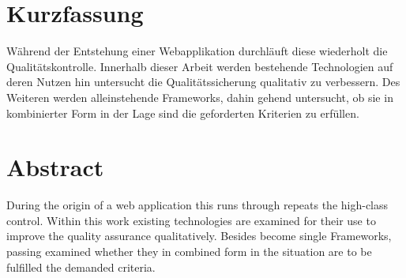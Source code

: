 \section*{Kurzfassung}
Während der Entstehung einer Webapplikation durchläuft diese wiederholt die Qualitätskontrolle. Innerhalb dieser Arbeit werden bestehende Technologien auf deren Nutzen hin untersucht die Qualitätssicherung qualitativ zu verbessern. Des Weiteren werden alleinstehende Frameworks, dahin gehend untersucht, ob sie in kombinierter Form in der Lage sind die geforderten Kriterien zu erfüllen.


\section*{Abstract}
During the origin of a web application this runs through repeats the high-class control. Within this work existing technologies are examined for their use to improve the quality assurance qualitatively. Besides become single Frameworks, passing examined whether they in combined form in the situation are to be fulfilled the demanded criteria.